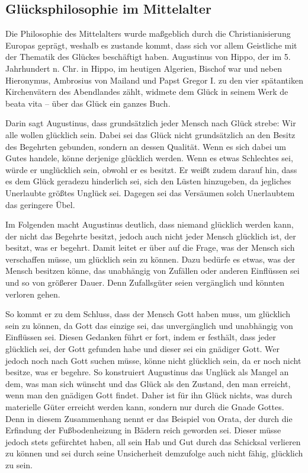 \newpage

\subsection{Glücksphilosophie im Mittelalter}

Die Philosophie des Mittelalters wurde maßgeblich durch die Christianisierung Europas geprägt, weshalb es zustande kommt, dass sich vor allem Geistliche mit der Thematik des Glückes beschäftigt haben. 
Augustinus von Hippo, der im 5. Jahrhundert n. Chr. in Hippo, im heutigen Algerien, Bischof war und neben Hieronymus, Ambrosius von Mailand und Papst Gregor I. zu den vier spätantiken Kirchenvätern des Abendlandes zählt, widmete dem Glück in seinem Werk \glqq de beata vita -- über das Glück\grqq{} ein ganzes Buch.

Darin sagt Augustinus, dass grundsätzlich jeder Mensch nach Glück strebe: \glqq Wir alle wollen glücklich sein.\grqq{}\cite[S.\,21]{A82}
Dabei sei das Glück nicht grundsätzlich an den Besitz des Begehrten gebunden, sondern an dessen Qualität. 
Wenn es sich dabei um Gutes handele, könne derjenige glücklich werden. 
Wenn es etwas Schlechtes sei, würde er unglücklich sein, obwohl er es besitzt. 
Er weißt zudem darauf hin, dass es dem Glück geradezu hinderlich sei, sich den Lüsten hinzugeben, da jegliches Unerlaubte größtes Unglück sei\cite[S.\,21]{A82}.
Dagegen sei das Versäumen solch Unerlaubtem das geringere Übel.

Im Folgenden macht Augustinus deutlich, dass niemand glücklich werden kann, der nicht das Begehrte besitzt, jedoch auch nicht jeder Mensch glücklich ist, der besitzt, was er begehrt. 
Damit leitet er über auf die Frage, was der Mensch sich verschaffen müsse, um glücklich sein zu können\cite[S.\,23]{A82}.
Dazu bedürfe es etwas, was der Mensch besitzen könne, das unabhängig von Zufällen oder anderen Einflüssen sei und so von größerer Dauer. 
Denn Zufallsgüter seien vergänglich und könnten verloren gehen. 

So kommt er zu dem Schluss, dass der Mensch Gott haben muss, um glücklich sein zu können, da Gott das einzige sei, das unvergänglich und unabhängig von Einflüssen sei. 
Diesen Gedanken führt er fort, indem er festhält, dass jeder glücklich sei, der Gott gefunden habe und dieser sei ein gnädiger Gott\cite[S.\,41]{A82}. 
Wer jedoch noch nach Gott suchen müsse, könne nicht glücklich sein, da er noch nicht besitze, was er begehre. 
So konstruiert Augustinus das Unglück als Mangel an dem, was man sich wünscht und das Glück als den Zustand, den man erreicht, wenn man den gnädigen Gott findet. 
Daher ist für ihn Glück nichts, was durch materielle Güter erreicht werden kann, sondern nur durch die Gnade Gottes. 
Denn in diesem Zusammenhang nennt er das Beispiel von Orata, der durch die Erfindung der Fußbodenheizung in Bädern reich geworden sei. 
Dieser müsse jedoch stets gefürchtet haben, all sein Hab und Gut durch das Schicksal verlieren zu können und sei durch seine Unsicherheit demzufolge auch nicht fähig, glücklich zu sein\cite[S.\,48]{A82}.

